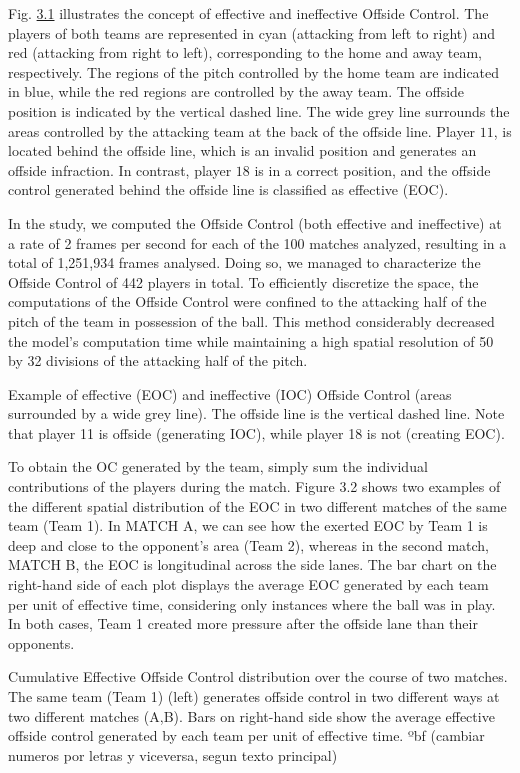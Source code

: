 \documentclass[twoside,nohyper]{tufte-book}
\begin{document}
Fig. \protect\hyperlink{f3.1}{3.1} illustrates the
concept of effective and ineffective Offside Control. The players of
both teams are represented in cyan (attacking from left to right) and
red (attacking from right to left), corresponding to the home and away
team, respectively. The regions of the pitch controlled by the home team
are indicated in blue, while the red regions are controlled by the away
team. The offside position is indicated by the vertical dashed line. The
wide grey line surrounds the areas controlled by the attacking team at
the back of the offside line. Player \(11\), is located behind the offside
line, which is an invalid position and generates an offside infraction.
In contrast, player \(18\) is in a correct position, and the offside
control generated behind the offside line is classified as effective
(EOC).

In the study, we computed the Offside Control (both effective and
ineffective) at a rate of 2 frames per second for each of the 100
matches analyzed, resulting in a total of 1,251,934 frames analysed.
Doing so, we managed to characterize the Offside Control of 442 players
in total. To efficiently discretize the space, the computations of the
Offside Control were confined to the attacking half of the pitch of the
team in possession of the ball. This method considerably decreased the
model's computation time while maintaining a high spatial resolution of
50 by 32 divisions of the attacking half of the pitch.

Example of effective (EOC) and ineffective (IOC) Offside
Control (areas surrounded by a wide grey line). The offside line is the
vertical dashed line. Note that player {11} is offside (generating IOC), while player
{18} is not (creating EOC).

To obtain the OC generated by the team, simply sum the individual
contributions of the players during the match. Figure 3.2 shows two
examples of the different spatial distribution of the EOC in two
different matches of the same team (Team 1). In MATCH A, we can see how
the exerted EOC by Team 1 is deep and close to the opponent's area (Team
2), whereas in the second match, MATCH B, the EOC is longitudinal across
the side lanes. The bar chart on the right-hand side of each plot
displays the average EOC generated by each team per unit of effective
time, considering only instances where the ball was in play. In both
cases, Team 1 created more pressure after the offside lane than their
opponents.

Cumulative Effective Offside Control distribution over the
course of two matches. The same team (Team 1) (left) generates offside
control in two different ways at two different matches (A,B). Bars on
right-hand side show the average effective offside control generated by
each team per unit of effective time. {ºbf (cambiar numeros por
letras y viceversa, segun texto principal)}
\end{document}
